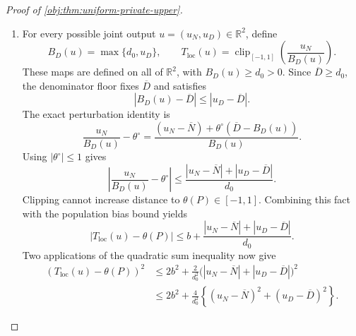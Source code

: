 \documentclass[11pt]{article}
\begin{document}
\begin{proof}[Proof of \cref{obj:thm:uniform-private-upper}]
\begin{enumerate}
For binary values
\(a_{\mathrm{obs}},a'_{\mathrm{obs}},
y_{\mathrm{obs}},y'_{\mathrm{obs}}\in\{0,1\}\),
\[
\left|
(a_{\mathrm{obs}}-a'_{\mathrm{obs}})
(y_{\mathrm{obs}}-y'_{\mathrm{obs}})
\right|
\le
(a_{\mathrm{obs}}-a'_{\mathrm{obs}})^2.
\]
Taking expectations under two independent observations conditional on cell \(j\) proves
\[
|\nu_j|\le d_j.
\]
The cell conditioning is well defined by the positive cell masses under the density bounds. The occupancy weights in \cref{obj:lem:occupancy-cancellation} are nonnegative, hence
\[
|\overline N|
\le\sum_{j=1}^k w_j|\nu_j|
\le\sum_{j=1}^k w_jd_j
=\overline D,
\qquad
|\theta^\circ|\le1.
\]
Also, \cref{obj:lem:point-version} supplies
\[
\theta(P)\in[-1,1].
\]

\item
For every possible joint output \(u=(u_N,u_D)\in\mathbb R^2\), define
\[
B_D(u)=\max\{d_0,u_D\},
\qquad
T_{\mathrm{loc}}(u)
=
\operatorname{clip}_{[-1,1]}
\left(\frac{u_N}{B_D(u)}\right).
\]
These maps are defined on all of \(\mathbb R^2\), with \(B_D(u)\ge d_0>0\). Since \(\overline D\ge d_0\), the denominator floor fixes \(\overline D\) and satisfies
\[
|B_D(u)-\overline D|\le|u_D-\overline D|.
\]
The exact perturbation identity is
\[
\frac{u_N}{B_D(u)}-\theta^\circ
=
\frac{
(u_N-\overline N)+
\theta^\circ(\overline D-B_D(u))
}{B_D(u)}.
\]
Using \(|\theta^\circ|\le1\) gives
\[
\left|\frac{u_N}{B_D(u)}-\theta^\circ\right|
\le
\frac{|u_N-\overline N|+|u_D-\overline D|}{d_0}.
\]
Clipping cannot increase distance to \(\theta(P)\in[-1,1]\). Combining this fact with the population bias bound yields
\[
|T_{\mathrm{loc}}(u)-\theta(P)|
\le
b+\frac{|u_N-\overline N|+|u_D-\overline D|}{d_0}.
\]
Two applications of the quadratic sum inequality now give
\[
\begin{aligned}
(T_{\mathrm{loc}}(u)-\theta(P))^2
&\le
2b^2+
\frac{2}{d_0^2}
\bigl(|u_N-\overline N|+|u_D-\overline D|\bigr)^2\\
&\le
2b^2+\frac4{d_0^2}
\left\{
(u_N-\overline N)^2+(u_D-\overline D)^2
\right\}.
\end{aligned}
\]


\end{enumerate}
\end{proof}
\end{document}
